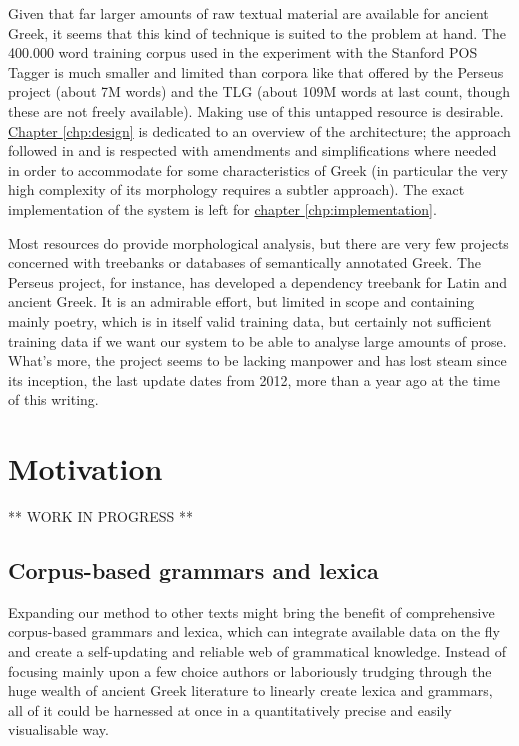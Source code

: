 Given that far larger amounts of raw textual material are available
for ancient Greek, it seems that this kind of technique is suited to
the problem at hand. The 400.000 word training corpus used in the
experiment with the Stanford POS Tagger is much smaller and limited
than corpora like that offered by the Perseus project (about 7M words)
and the TLG (about 109M words at last count, though these are not
freely available). Making use of this untapped resource is
desirable. \hyperref[chp:design]{Chapter \ref*{chp:design}} is
dedicated to an overview of the architecture; the approach followed in
\citet{collobert-2011} and \citet{turian2010word} is respected with
amendments and simplifications where needed in order to accommodate
for some characteristics of Greek (in particular the very high
complexity of its morphology requires a subtler approach). The exact
implementation of the system is left for
\hyperref[chp:implementation]{chapter \ref*{chp:implementation}}.

Most resources do provide morphological analysis, but there are very
few projects concerned with treebanks or databases of semantically
annotated Greek. The Perseus project, for instance, has developed a
dependency treebank for Latin and ancient Greek. It is an admirable
effort, but limited in scope and containing mainly poetry, which is in
itself valid training data, but certainly not sufficient training data
if we want our system to be able to analyse large amounts of prose.
What's more, the project seems to be lacking manpower and has lost
steam since its inception, the last update dates from 2012, more than
a year ago at the time of this writing.


\section{Motivation}

** WORK IN PROGRESS **

\subsection{Corpus-based grammars and lexica}
\label{sec:corpusbasedgrammars}
Expanding our method to other texts might bring the benefit of
comprehensive corpus-based grammars and lexica, which can integrate
available data on the fly and create a self-updating and reliable web
of grammatical knowledge. Instead of focusing mainly upon a few choice
authors or laboriously trudging through the huge wealth of ancient
Greek literature to linearly create lexica and grammars, all of it
could be harnessed at once in a quantitatively precise and easily
visualisable way.

